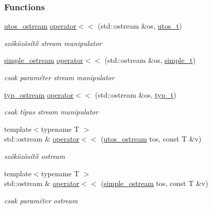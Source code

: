 \subsubsection*{Functions}
\begin{DoxyCompactItemize}
\item 
\mbox{\hyperlink{structutos__ostream}{utos\+\_\+ostream}} \mbox{\hyperlink{schtring_8hpp_a43aac73473ffa53d46bd5f53f0570e3e}{operator$<$$<$}} (std\+::ostream \&os, \mbox{\hyperlink{structutos__t}{utos\+\_\+t}})
\begin{DoxyCompactList}\small\item\em szóközösítő stream manipulator \end{DoxyCompactList}\item 
\mbox{\hyperlink{structsimple__ostream}{simple\+\_\+ostream}} \mbox{\hyperlink{schtring_8hpp_aea28f4c85e19de48a35b1479e9cc192f}{operator$<$$<$}} (std\+::ostream \&os, \mbox{\hyperlink{structsimple__t}{simple\+\_\+t}})
\begin{DoxyCompactList}\small\item\em csak paraméter stream manipulator \end{DoxyCompactList}\item 
\mbox{\hyperlink{structtyp__ostream}{typ\+\_\+ostream}} \mbox{\hyperlink{schtring_8hpp_a4d21dd8939fd627f88d08115283381b8}{operator$<$$<$}} (std\+::ostream \&os, \mbox{\hyperlink{structtyp__t}{typ\+\_\+t}})
\begin{DoxyCompactList}\small\item\em csak típus stream manipulator \end{DoxyCompactList}\item 
{\footnotesize template$<$typename T $>$ }\\std\+::ostream \& \mbox{\hyperlink{schtring_8hpp_a89c0d4114f2a28d8ba3812f91ac3d0d2}{operator$<$$<$}} (\mbox{\hyperlink{structutos__ostream}{utos\+\_\+ostream}} tos, const T \&v)
\begin{DoxyCompactList}\small\item\em szóközösítő ostream \end{DoxyCompactList}\item 
{\footnotesize template$<$typename T $>$ }\\std\+::ostream \& \mbox{\hyperlink{schtring_8hpp_aea9b47ee5ee0daeefc307790dac9dbcf}{operator$<$$<$}} (\mbox{\hyperlink{structsimple__ostream}{simple\+\_\+ostream}} tos, const T \&v)
\begin{DoxyCompactList}\small\item\em csak paraméter ostream \end{DoxyCompactList}\item 

\end{DoxyCompactItemize}

